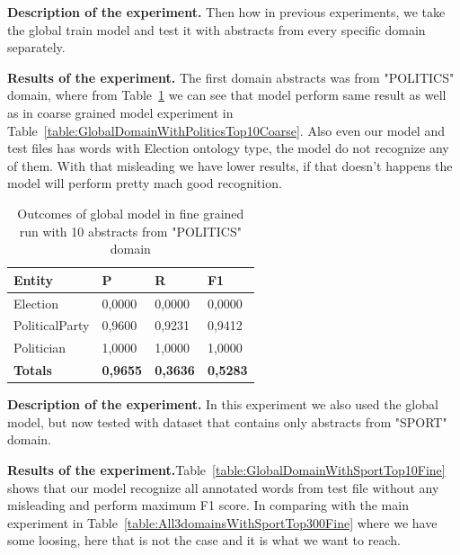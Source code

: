 \documentclass[thesis=M,english]{FITthesis}[2018/05/30]
\begin{document}
	\textbf{Description of the experiment.} Then how in previous experiments, we take the global train model and test it with abstracts from every specific domain separately. 
	
	\textbf{Results of the experiment.} The first domain abstracts was from "POLITICS" domain, where from Table~\ref{table:GlobalDomainWithPoliticsTop10Fine} we can see that model perform same result as well as in coarse grained model experiment in Table~\ref{table:GlobalDomainWithPoliticsTop10Coarse}. Also even our model and test files has words with Election ontology type, the model do not recognize any of them. With that misleading we have lower results, if that doesn't happens the model will perform pretty mach good recognition.
	
	\begin{table}[H]\centering
		\begin{tabular}{|l|l|l|l|}
			\hline {\textbf{Entity}} & {\textbf{P}} & {\textbf{R}} & {\textbf{F1}}\\\hline
				Election & 0,0000 & 0,0000 & 0,0000\\
				PoliticalParty & 0,9600 & 0,9231 & 0,9412\\
				Politician & 1,0000 & 1,0000 & 1,0000\\\hline
				\textbf{Totals} & \textbf{0,9655} & \textbf{0,3636} & \textbf{0,5283}\\\hline
		\end{tabular}
		\caption{Outcomes of global model in fine grained run with 10 abstracts from "POLITICS" domain \label{table:GlobalDomainWithPoliticsTop10Fine}}		
	\end{table}	

	\textbf{Description of the experiment.} In this experiment we also used the global model, but now tested with dataset that contains only abstracts from "SPORT" domain. 
	
	\textbf{Results of the experiment.}Table~\ref{table:GlobalDomainWithSportTop10Fine} shows that our model recognize all annotated words from test file without any misleading and perform maximum F1 score. In comparing with the main experiment in Table~\ref{table:All3domainsWithSportTop300Fine} where we have some loosing, here that is not the case and it is what we want to reach.
	
\end{document}
